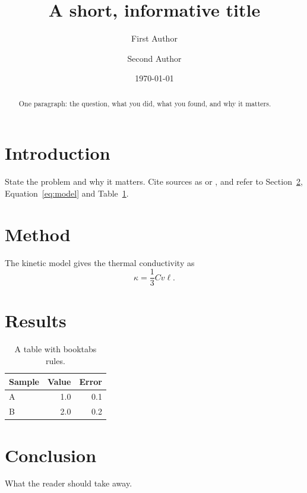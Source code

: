 \documentclass[11pt]{article}
\title{A short, informative title}
\author{First Author \and Second Author}
\date{\today}
\begin{document}
\maketitle

\begin{abstract}
One paragraph: the question, what you did, what you found, and why it matters.
\end{abstract}

\section{Introduction}
\label{sec:intro}
State the problem and why it matters. Cite sources as \cite{callaway1959} or \cite{slack1973,ziman1960}, and
refer to Section~\ref{sec:method}, Equation~\eqref{eq:model} and Table~\ref{tab:results}.

\section{Method}
\label{sec:method}
The kinetic model gives the thermal conductivity as
\begin{equation}
  \kappa = \frac{1}{3} C v \ell .
  \label{eq:model}
\end{equation}

\section{Results}
\begin{table}[htbp]
  \centering
  \caption{A table with booktabs rules.}
  \label{tab:results}
  \begin{tabular}{lrr}
    \toprule
    Sample & Value & Error \\
    \midrule
    A & 1.0 & 0.1 \\
    B & 2.0 & 0.2 \\
    \bottomrule
  \end{tabular}
\end{table}

\section{Conclusion}
What the reader should take away.



\end{document}
